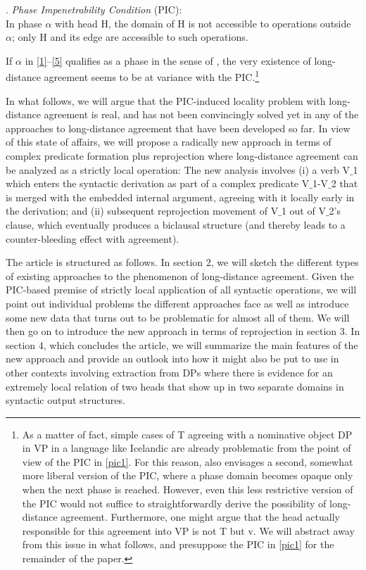 \documentclass[output=paper
,modfonts
,nonflat]{langsci/langscibook}
\begin{document}
\Lsciexi. {\itshape Phase Impenetrability Condition} \label{pic1}(PIC):\\
  In phase $\alpha$ with head H, the domain of H is not accessible to
  operations outside $\alpha$; only H and its edge are accessible to such
  operations.


If $\alpha$ in \ref{1}--\ref{5} qualifies as a phase in the sense of
\Last, the very existence of long-distance agreement seems to be at
variance with the PIC.\footnote{\label{fn1}As a matter of fact, simple cases of T
  agreeing with a nominative object DP in VP in a language like
  Icelandic are already problematic from the point of view of the PIC
  in \ref{pic1}. For this reason, \cite{Chomsky:01} also envisages a
  second, somewhat more liberal version of the PIC, where a phase
  domain becomes opaque only when the next phase is reached. However, even
  this less restrictive version of the PIC would not suffice to
  straightforwardly derive the possibility of long-distance
  agreement. Furthermore, one might argue that the head actually
  responsible for this agreement into VP is not T but v. We will
  abstract away from this issue in what follows, and presuppose the
  PIC in \ref{pic1} for the remainder of the paper.}

In what follows, we will argue that the PIC-induced locality problem
with long-distance agreement is real, and has not been
convincingly solved yet in any of the approaches to long-distance
agreement that have been developed so far. In view of this state of
affairs, we will propose a radically new approach in terms of complex
predicate formation plus reprojection where long-distance agreement
can be analyzed as a strictly local operation: The new analysis  involves (i) a verb
V$\_$1 which enters the syntactic derivation as part of a complex
predicate V$\_$1-V$\_$2 that is merged with the embedded internal argument,
agreeing with it locally early in the derivation; and (ii) subsequent
reprojection movement of V$\_$1 out of V$\_$2's clause, which eventually
produces a biclausal structure (and thereby leads to a
counter-bleeding effect with agreement). 

The article is structured as follows. In section 2, we will sketch the
different types of existing approaches to the phenomenon of
long-distance agreement. Given the PIC-based premise of strictly local
application of all syntactic operations, we will point out individual
problems the different approaches face as well as introduce some new
data that turns out to be problematic for almost all of them. We will
then go on to introduce the new approach in terms of reprojection in
section 3. In section 4, which concludes the article, we will
summarize the main features of the new approach and provide an outlook
into how it might also be put to use in other contexts involving
extraction from DPs where there is evidence for an extremely local
relation of two heads that show up in two separate domains in
syntactic output structures.
  
\end{document}
